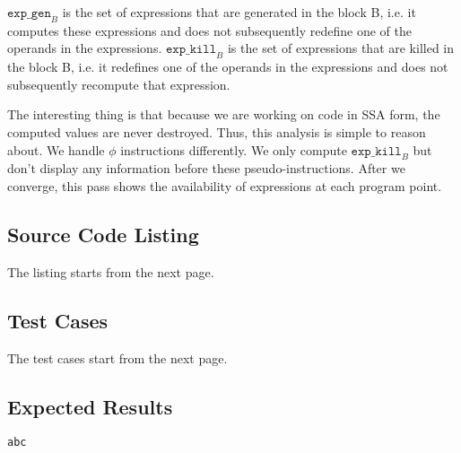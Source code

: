 $\texttt{exp\_gen}_{B}$ is the set of expressions that are generated in the block B, i.e. it computes these
expressions and does not subsequently redefine one of the operands in the expressions.
$\texttt{exp\_kill}_{B}$ is the set of expressions that are killed in the block B, i.e. it
redefines one of the operands in the expressions and does not subsequently recompute that expression.

The interesting thing is that because we are working on code in SSA form, the computed values are never
destroyed. Thus, this analysis is simple to reason about.
We handle $\phi$ instructions differently. We only compute $\texttt{exp\_kill}_{B}$ but don't display any
information before these pseudo-instructions.
After we converge, this pass shows the availability of expressions at each program point.

\subsection{Source Code Listing}

The listing starts from the next page.



\subsection{Test Cases}

The test cases start from the next page.



\subsection{Expected Results}

\begingroup
\fontsize{6pt}{8pt}\selectfont
\begin{verbatim}
abc
\end{verbatim}
\endgroup

